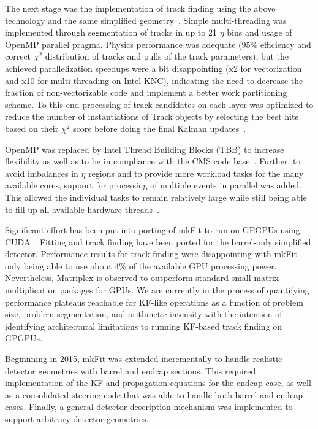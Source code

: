 \documentclass{webofc}
\def\mkfit{mkFit\xspace}
\begin{document}
The next stage was the implementation of track finding using the above
technology and the same simplified geometry~\cite{pkf-finding}. Simple
multi-threading was implemented through segmentation of tracks in up to 21
$\eta$ bins and usage of OpenMP parallel pragma. Physics performance was
adequate (95\% efficiency and correct $\chi^2$ distribution of tracks and
pulls of the track parameters), but the achieved parallelization speedups were
a bit disappointing (x2 for vectorization and x10 for multi-threading on Intel
KNC), indicating the need to decrease the fraction of non-vectorizable code
and implement a better work partitioning scheme. To this end processing of
track candidates on each layer was optimized to reduce the number of
instantiations of Track objects by selecting the best hits based on their
$\chi^2$ score before doing the final Kalman updates~\cite{pkf-clone-engine}.

OpenMP was replaced by Intel Thread Building Blocks (TBB) to increase
flexibility as well as to be in compliance with the CMS code
base~\cite{pkf-tbb}. Further, to avoid imbalances in $\eta$ regions and to
provide more workload tasks for the many available cores, support for
processing of multiple events in parallel was added. This allowed the
individual tasks to remain relatively large while still being able to fill up
all available hardware threads~\cite{pkf-acat-17}.

Significant effort has been put into porting of \mkfit to run on GPGPUs using
CUDA~\cite{pkf-gpu}. Fitting and track finding have been ported for the
barrel-only simplified detector. Performance results for track finding were
disappointing with \mkfit only being able to use about 4\% of the available
GPU processing power. Nevertheless, Matriplex is observed to outperform
standard small-matrix multiplication packages for GPUs. We are currently in
the process of quantifying performance plateaus reachable for KF-like
operations as a function of problem size, problem segmentation, and arithmetic
intensity with the intention of identifying architectural limitations to
running KF-based track finding on GPGPUs.

Beginnning in 2015, \mkfit was extended incrementally to handle realistic
detector geometries with barrel and endcap sections. This required
implementation of the KF and propagation equations for the endcap case, as
well as a consolidated steering code that was able to handle both barrel and
endcap cases. Finally, a general detector description mechanism was
implemented to support arbitrary detector geometries.
\end{document}
